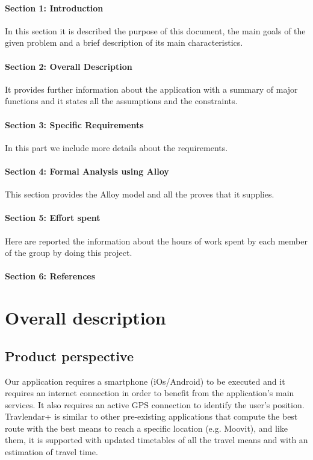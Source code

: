 \documentclass[12pt,titlepage]{article}
\begin{document}
\paragraph{Section 1: Introduction}
In this section it is described the purpose of this document, the main goals of the given problem and a brief description of its main characteristics. 
\paragraph{Section 2: Overall Description}
It provides further information about the application with a summary of major functions and it states all the assumptions and the constraints.
\paragraph{Section 3: Specific Requirements}
In this part we include more details about the requirements.
\paragraph{Section 4: Formal Analysis using Alloy}
This section provides the Alloy model and all the proves that it supplies.
\paragraph{Section 5: Effort spent}
Here are reported the information about the hours of work spent by each member of the group by doing this project.
\paragraph{Section 6: References}
\pagebreak

\section{Overall description}\label{sec:crit}

\subsection{Product perspective}\label{sec:mod1}
Our application requires a smartphone (iOs/Android) to be executed and it requires an internet connection in order to benefit from the application's main services.
It also requires an active GPS connection to identify the user's position. 
Travlendar+ is similar to other pre-existing applications that compute the best route with the best means to reach a specific location (e.g. Moovit), and like them, it is supported with updated timetables of all the travel means and with an estimation of travel time. 
\end{document}
